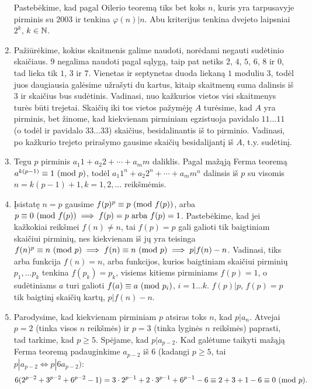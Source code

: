 \begin{enumerate}
Pastebėkime, kad pagal Oilerio teoremą tiks bet koks $n$, kuris yra
tarpusavyje pirminis su $2003$ ir tenkina $\varphi(n)|n$. Abu
kriterijus tenkina dvejeto laipsniai $2^k$, $k\in \mathbb N$.
\item 
Pažiūrėkime, kokius skaitmenis galime naudoti, norėdami negauti
sudėtinio skaičiaus. $9$ negalima naudoti pagal sąlygą, taip pat
netiks $2$, $4$, $5$, $6$, $8$ ir $0$, tad lieka tik $1$, $3$ ir $7$.
Vienetas ir septynetas duoda liekaną $1$ moduliu $3$, todėl juos
daugiausia galėsime užrašyti du kartus, kitaip skaitmenų suma dalinsis
iš $3$ ir skaičius bus sudėtinis. Vadinasi, nuo kažkurios vietos visi
skaitmenys turės būti trejetai. Skaičių iki tos vietos pažymėję $A$
turėsime, kad $A$ yra pirminis, bet žinome, kad kiekvienam pirminiam
egzistuoja pavidalo $11\dots11$ (o todėl ir pavidalo $33\dots33$)
skaičius, besidalinantis iš to pirminio. Vadinasi, po kažkurio trejeto
prirašymo gausime skaičių besidalijantį iš $A$, t.y. sudėtinį.
\item 
Tegu $p$ pirminis $a_1 1 + a_2 2 + \cdots + a_m m$ daliklis.  Pagal
mažąją Ferma teoremą $a^{k(p-1)}  \equiv 1 \ (\text{mod } p)$, todėl $a_1 1^n + a_2
2^n + \cdots + a_m m^n$ dalinsis iš $p$ su visomis $n = k(p-1) + 1,
k=1,2, \dots$ reikšmėmis.  
\item 
Įsistatę $n=p$ gausime $f(p)^p\equiv p \ (\text{mod } f(p))$, arba $p\equiv 0
\ (\text{mod } f(p)) \implies f(p) = p \text{ arba } f(p) = 1$. Pastebėkime, kad
jei kažkokiai reikšmei $f(n) \neq n$, tai $f(p) = p$ gali galioti tik
baigtiniam skaičiui pirminių, nes kiekvienam iš jų yra teisinga
$f(n)^p \equiv n \ (\text{mod } p) \implies f(n)\equiv n \ (\text{mod } p) \implies p|f(n) -
n$. Vadinasi, tiks arba funkcija $f(n) = n$, arba funkcijos, kurios
baigtiniam skaičiui pirminių $p_1, \ldots p_k$ tenkina $f(p_k) = p_k$,
visiems kitiems pirminiams $f(p)=1$, o sudėtiniams $a$ turi galioti
$f(a) \equiv a \ (\text{mod } p_i)$, $i=1\ldots k$.
$f(p)|p$, $f(p)=p$ tik baigtinį skaičių kartų, $p|f(n) - n$. 
\item 
Parodysime, kad kiekvienam pirminiam $p$ atsiras toks $n$, kad
$p|a_n$. Atvejai $p=2$ (tinka visos $n$ reikšmės) ir $p=3$ (tinka
lyginės $n$ reikšmės) paprasti, tad tarkime, kad $p\geq 5$. Spėjame,
kad $p|a_{p-2}$. Kad galėtume taikyti mažąją Ferma teoremą
padauginkime $a_{p-2}$ iš $6$ (kadangi $p\geq 5$, tai $p|a_{p-2} \iff
p|6a_{p-2})$: $$6(2^{p-2} + 3^{p-2} + 6^{p-2} - 1) = 3\cdot 2^{p-1} +
2\cdot 3^{p-1} + 6^{p-1} - 6 \equiv 2 + 3 + 1 - 6 \equiv 0 \ (\text{mod } p).$$
\end{enumerate} 
